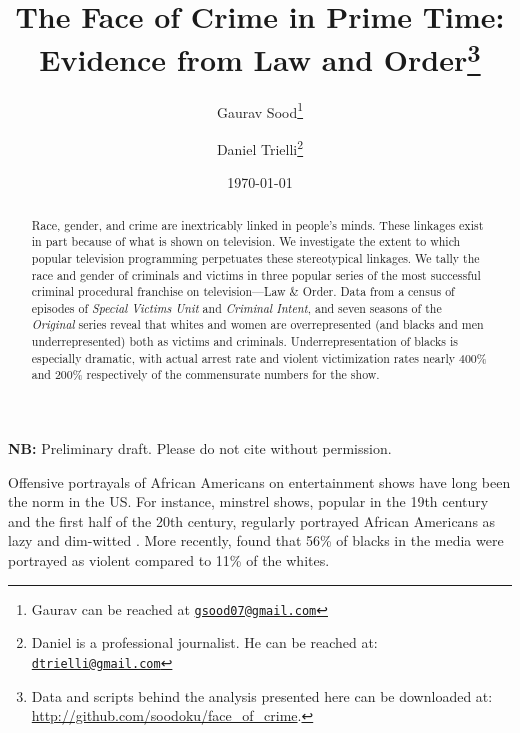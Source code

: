 \documentclass[12pt, letterpaper]{article}
\title{\Large{The Face of Crime in Prime Time:\\ Evidence from Law and Order}\footnote{Data and scripts behind the analysis presented here can be downloaded at: \url{http://github.com/soodoku/face_of_crime}.}}
\author{Gaurav Sood\thanks{Gaurav can be reached at \href{mailto:gsood07@gmail.com}{\footnotesize{\texttt{gsood07@gmail.com}}}} \and Daniel Trielli\thanks{Daniel is a professional journalist. He can be reached at: \href{mailto:dtrielli@gmail.com}{\footnotesize{\texttt{dtrielli@gmail.com}}}}\vspace{.5cm}}
\date{\vspace{.5cm}\normalsize{\today}}
\begin{document}
\maketitle

\begin{center}
\vspace{.5cm}\textbf{NB:} Preliminary draft. Please do not cite without permission.\vspace{1.5cm}
\end{center}

\begin{abstract}
\noindent Race, gender, and crime are inextricably linked in people's minds. These linkages exist in part because of what is shown on television. We investigate the extent to which popular television programming perpetuates these stereotypical linkages. We tally the race and gender of criminals and victims in three popular series of the most successful criminal procedural franchise on television---Law \& Order. Data from a census of episodes of \textit{Special Victims Unit} and \textit{Criminal Intent}, and seven seasons of the \textit{Original} series reveal that whites and women are overrepresented (and blacks and men underrepresented) both as victims and criminals. Underrepresentation of blacks is especially dramatic, with actual arrest rate and violent victimization rates nearly 400\% and 200\% respectively of the commensurate numbers for the show. 
\end{abstract}
\clearpage
\doublespace

Offensive portrayals of African Americans on entertainment shows have long been the norm in the US. For instance, minstrel shows, popular in the 19th century and the first half of the 20th century, regularly portrayed African Americans as lazy and dim-witted \citep{dates1993split, toll1974blacking}. More recently, \citet{entman2001black} found that 56\% of blacks in the media were portrayed as violent compared to 11\% of the whites.
\end{document}
